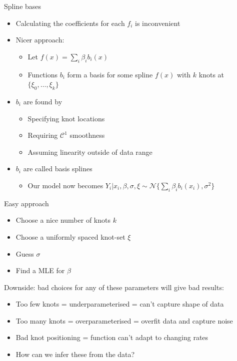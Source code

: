 \documentclass[presentation]{beamer}
\begin{document}
\begin{frame}[label={sec:org5f97c8a}]{Spline bases}
\begin{itemize}[<+->]
\item Calculating the coefficients for each \(f_i\) is inconvenient
\item Nicer approach:
\begin{itemize}
\item Let \(f(x) = \sum_i \beta_i b_i(x)\)
\item Functions \(b_i\) form a basis for some spline \(f(x)\) with \(k\) knots at \(\{\xi_0, \dots, \xi_k\}\)
\end{itemize}
\item \(b_i\) are found by
\begin{itemize}
\item Specifying knot locations
\item Requiring \(\mathcal{C}^1\) smoothness
\item Assuming linearity outside of data range
\end{itemize}

\item \(b_i\) are called basis splines
\begin{itemize}
\item Our model now becomes \(Y_i | x_i, \beta, \sigma, \xi \sim \mathcal{N}\{\sum_i \beta_i b_i(x_i), \sigma^2\}\)
\end{itemize}
\end{itemize}
\end{frame}

\begin{frame}[label={sec:orgcefff1f}]{Easy approach}
\begin{itemize}[<+->]
\item Choose a nice number of knots \(k\)
\item Choose a uniformly spaced knot-set \(\xi\)
\item Guess \(\sigma\)
\item Find a MLE for \(\beta\)
\end{itemize}

\vfill

Downside: bad choices for any of these parameters will give bad results:

\begin{itemize}[<+->]
\item Too few knots = underparameterised = can't capture shape of data
\item Too many knots = overparameterised = overfit data and capture noise
\item Bad knot positioning = function can't adapt to changing rates
\item How can we infer these from the data?
\end{itemize}
\end{frame}
\end{document}
